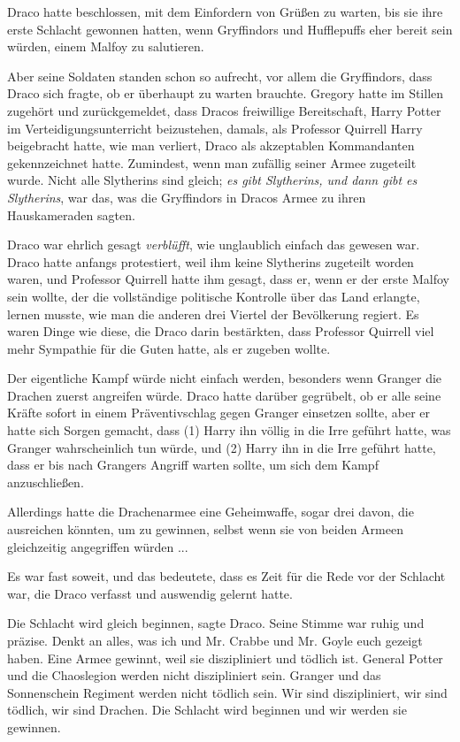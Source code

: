 Draco hatte beschlossen, mit dem Einfordern von Grüßen zu warten, bis sie ihre
erste Schlacht gewonnen hatten, wenn Gryffindors und Hufflepuffs eher bereit
sein würden, einem Malfoy zu salutieren.

Aber seine Soldaten standen schon so aufrecht, vor allem die Gryffindors, dass
Draco sich fragte, ob er überhaupt zu warten brauchte. Gregory hatte im Stillen
zugehört und zurückgemeldet, dass Dracos freiwillige Bereitschaft, Harry Potter
im Verteidigungsunterricht beizustehen, damals, als Professor Quirrell Harry
beigebracht hatte, wie man verliert, Draco als akzeptablen Kommandanten
gekennzeichnet hatte. Zumindest, wenn man zufällig seiner Armee zugeteilt wurde.
Nicht alle Slytherins sind gleich; \emph{es gibt Slytherins, und dann gibt es
Slytherins}, war das, was die Gryffindors in Dracos Armee zu ihren Hauskameraden
sagten.

Draco war ehrlich gesagt \emph{verblüfft}, wie unglaublich einfach das gewesen
war. Draco hatte anfangs protestiert, weil ihm keine Slytherins zugeteilt worden
waren, und Professor Quirrell hatte ihm gesagt, dass er, wenn er der erste
Malfoy sein wollte, der die vollständige politische Kontrolle über das Land
erlangte, lernen musste, wie man die anderen drei Viertel der Bevölkerung
regiert. Es waren Dinge wie diese, die Draco darin bestärkten, dass Professor
Quirrell viel mehr Sympathie für die Guten hatte, als er zugeben wollte.

Der eigentliche Kampf würde nicht einfach werden, besonders wenn Granger die
Drachen zuerst angreifen würde. Draco hatte darüber gegrübelt, ob er alle seine
Kräfte sofort in einem Präventivschlag gegen Granger einsetzen sollte, aber er
hatte sich Sorgen gemacht, dass (1) Harry ihn völlig in die Irre geführt hatte,
was Granger wahrscheinlich tun würde, und (2) Harry ihn in die Irre geführt
hatte, dass er bis nach Grangers Angriff warten sollte, um sich dem Kampf
anzuschließen.

Allerdings hatte die Drachenarmee eine Geheimwaffe, sogar drei davon, die
ausreichen könnten, um zu gewinnen, selbst wenn sie von beiden Armeen
gleichzeitig angegriffen würden ...

Es war fast soweit, und das bedeutete, dass es Zeit für die Rede vor der
Schlacht war, die Draco verfasst und auswendig gelernt hatte.

\glqq{}Die Schlacht wird gleich beginnen\grqq{}, sagte Draco. Seine Stimme war
ruhig und präzise. \glqq{}Denkt an alles, was ich und Mr. Crabbe und Mr. Goyle
euch gezeigt haben. Eine Armee gewinnt, weil sie diszipliniert und tödlich ist.
General Potter und die Chaoslegion werden nicht diszipliniert sein. Granger und
das Sonnenschein Regiment werden nicht tödlich sein. Wir sind diszipliniert, wir
sind tödlich, wir sind Drachen. Die Schlacht wird beginnen und wir werden sie
gewinnen.\grqq{}

